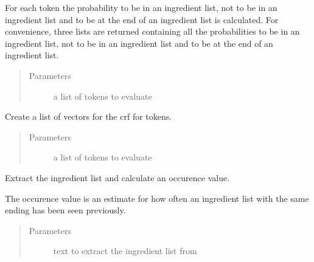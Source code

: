 \documentclass[letterpaper,10pt,english]{sphinxmanual}
\begin{document}
\begin{fulllineitems}
\begin{fulllineitems}
For each token the probability to be in an ingredient list,
not to be in an ingredient list and to be at the end of an
ingredient list is calculated. For convenience, three lists
are returned containing all the probabilities to be in an
ingredient list, not to be in an ingredient list and to be at
the end of an ingredient list.
\begin{quote}\begin{description}
\item[{Parameters}] \leavevmode
{} \textendash{} a list of tokens to evaluate

\end{description}\end{quote}

\end{fulllineitems}


\begin{fulllineitems}
\label{\detokenize{api:ingredient_extractor.IngredientExtractor.create_vec_list}}
Create a list of vectors for the crf for tokens.
\begin{quote}\begin{description}
\item[{Parameters}] \leavevmode
{} \textendash{} a list of tokens to evaluate

\end{description}\end{quote}

\end{fulllineitems}


\begin{fulllineitems}
\label{\detokenize{api:ingredient_extractor.IngredientExtractor.extract}}
Extract the ingredient list and calculate an occurence value.

The occurence value is an estimate for how often an ingredient
list with the same ending has been seen previously.
\begin{quote}\begin{description}
\item[{Parameters}] \leavevmode
{} \textendash{} text to extract the ingredient list from


\end{description}
\end{quote}
\end{fulllineitems}
\end{fulllineitems}
\end{document}
